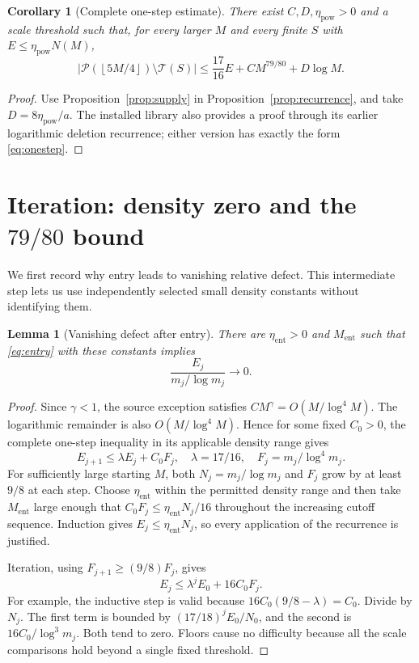 \documentclass[11pt]{article}
\newtheorem{lemma}[theorem]{Lemma}
\newtheorem{corollary}[theorem]{Corollary}
\theoremstyle{definition}
\theoremstyle{remark}
\newcommand{\PP}{\mathcal P}
\newcommand{\cT}{\mathcal T}
\newcommand{\card}[1]{\lvert #1\rvert}
\newcommand{\floor}[1]{\left\lfloor #1\right\rfloor}
\begin{document}
\begin{corollary}[Complete one-step estimate]\label{cor:onestep}
There exist \(C,D,\eta_{\mathrm{pow}}>0\) and a scale threshold such
that, for every larger \(M\) and every finite \(S\) with
\(E\le\eta_{\mathrm{pow}}N(M)\),
\begin{equation}\label{eq:onestep}
 \card{\PP(\floor{5M/4})\setminus\cT(S)}
 \le\frac{17}{16}E+CM^{79/80}+D\log M.
\end{equation}
\end{corollary}
\begin{proof}
Use Proposition~\ref{prop:supply} in
Proposition~\ref{prop:recurrence}, and take
\(D=8\eta_{\mathrm{pow}}/a\).
The installed library also provides a proof through its earlier
logarithmic deletion recurrence; either version has exactly the
form \eqref{eq:onestep}.
\end{proof}

\section{Iteration: density zero and the \(79/80\) bound}\label{sec:iteration}

We first record why entry leads to vanishing relative defect.
This intermediate step lets us use independently selected small
density constants without identifying them.

\begin{lemma}[Vanishing defect after entry]\label{lem:zero}
There are \(\eta_{\mathrm{ent}}>0\) and \(M_{\mathrm{ent}}\) such that
\eqref{eq:entry} with these constants implies
\[
 \frac{E_j}{m_j/\log m_j}\longrightarrow0.
\]
\end{lemma}

\begin{proof}
Since \(\gamma<1\), the source exception satisfies
\(CM^\gamma=O(M/\log^4M)\). The logarithmic remainder is also
\(O(M/\log^4M)\). Hence for some fixed \(C_0>0\), the complete
one-step inequality in its applicable density range gives
\[
 E_{j+1}\le\lambda E_j+C_0F_j,\quad
 \lambda=17/16,\quad F_j=m_j/\log^4m_j.
\]
For sufficiently large starting \(M\), both
\(N_j=m_j/\log m_j\) and \(F_j\) grow by at least \(9/8\)
at each step. Choose \(\eta_{\mathrm{ent}}\) within the permitted
density range and then take \(M_{\mathrm{ent}}\) large enough
that \(C_0F_j\le\eta_{\mathrm{ent}}N_j/16\) throughout the
increasing cutoff sequence. Induction gives
\(E_j\le\eta_{\mathrm{ent}}N_j\), so every application of the
recurrence is justified.

Iteration, using \(F_{j+1}\ge(9/8)F_j\), gives
\[
 E_j\le\lambda^jE_0+16C_0F_j.
\]
For example, the inductive step is valid because
\(16C_0(9/8-\lambda)=C_0\).
Divide by \(N_j\). The first term is bounded by
\((17/18)^j E_0/N_0\), and the second is
\(16C_0/\log^3m_j\). Both tend to zero. Floors cause no
difficulty because all the scale comparisons hold beyond a
single fixed threshold.
\end{proof}
\end{document}
